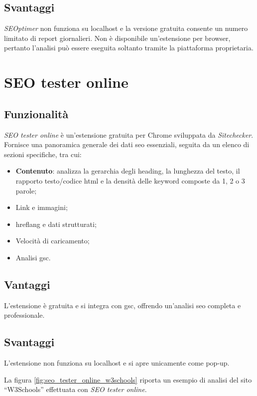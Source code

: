 \subsection{Svantaggi}
\textit{SEOptimer} non funziona su \gls{localhost} e la versione gratuita consente un numero limitato di report giornalieri. Non è disponibile un'estensione per browser, pertanto l'analisi può essere eseguita soltanto tramite la piattaforma proprietaria.

\section{SEO tester online}

\subsection{Funzionalità}
\textit{SEO tester online} è un'estensione gratuita per Chrome sviluppata da \textit{Sitechecker}. Fornisce una panoramica generale dei dati \gls{seo} essenziali, seguita da un elenco di sezioni specifiche, tra cui:
\begin{itemize}
    \item \textbf{Contenuto}: analizza la gerarchia degli heading, la lunghezza del testo, il rapporto testo/codice \gls{html} e la densità delle keyword composte da 1, 2 o 3 parole;
    \item Link e immagini;
    \item \Gls{hreflang} e dati strutturati;
    \item Velocità di caricamento;
    \item Analisi \gls{gsc}.
\end{itemize}

\subsection{Vantaggi}
L'estensione è gratuita e si integra con \gls{gsc}, offrendo un'analisi \gls{seo} completa e professionale.

\subsection{Svantaggi}
L'estensione non funziona su \gls{localhost} e si apre unicamente come pop-up.

\vspace{15pt}
\noindent La figura \ref{fig:seo_tester_online_w3schools} riporta un esempio di analisi del sito “W3Schools” effettuata con \textit{SEO tester online}.

